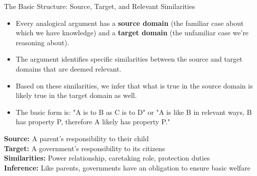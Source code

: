\documentclass{beamer}
\begin{document}
	\begin{frame}{The Basic Structure: Source, Target, and Relevant Similarities}
		\begin{itemize}
			\item Every analogical argument has a \textbf{source domain} (the familiar case about which we have knowledge) and a \textbf{target domain} (the unfamiliar case we're reasoning about).
			\item The argument identifies specific similarities between the source and target domains that are deemed relevant.
			\item Based on these similarities, we infer that what is true in the source domain is likely true in the target domain as well.
			\item The basic form is: "A is to B as C is to D" or "A is like B in relevant ways, B has property P, therefore A likely has property P."
		\end{itemize}
		
		\begin{example}
			\scriptsize
			\textbf{Source:} A parent's responsibility to their child\\
			\textbf{Target:} A government's responsibility to its citizens\\
			\textbf{Similarities:} Power relationship, caretaking role, protection duties\\
			\textbf{Inference:} Like parents, governments have an obligation to ensure basic welfare
		\end{example}
	\end{frame}
	
\end{document}
